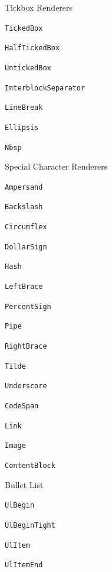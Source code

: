 \documentclass[
  digital,     %
  oneside,     %
  nosansbold,  %
  nocolorbold, %
  lof,         %
  nolot,       %
]{fithesis4}
\begin{document}
\begin{figure}
  \centering
  \begin{multicols}{2}
    \footnotesize
    \begin{compactenum}
      \item Tickbox Renderers
      \begin{compactenum}
        \item \texttt{TickedBox}
        \item \texttt{HalfTickedBox}
        \item \texttt{UntickedBox}
      \end{compactenum}
      \item \texttt{InterblockSeparator}
      \item \texttt{LineBreak}
      \item \texttt{Ellipsis}
      \item \texttt{Nbsp}
      \item Special Character Renderers
      \begin{compactenum}
        \item \texttt{Ampersand}
        \item \texttt{Backslash}
        \item \texttt{Circumflex}
        \item \texttt{DollarSign}
        \item \texttt{Hash}
        \item \texttt{LeftBrace}
        \item \texttt{PercentSign}
        \item \texttt{Pipe}
        \item \texttt{RightBrace}
        \item \texttt{Tilde}
        \item \texttt{Underscore}
      \end{compactenum}
      \item \texttt{CodeSpan}
      \item \texttt{Link}
      \item \texttt{Image}
      \item \texttt{ContentBlock}
      \item Bullet List
      \begin{compactenum}
        \item \texttt{UlBegin}
        \item \texttt{UlBeginTight}
        \item \texttt{UlItem}
        \item \texttt{UlItemEnd}

\end{compactenum}
\end{compactenum}
\end{multicols}
\end{figure}
\end{document}
